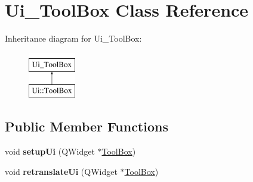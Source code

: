 \hypertarget{class_ui___tool_box}{\section{Ui\-\_\-\-Tool\-Box Class Reference}
\label{class_ui___tool_box}
}
Inheritance diagram for Ui\-\_\-\-Tool\-Box\-:\begin{figure}[H]
\begin{center}
\leavevmode
\includegraphics[height=2.000000cm]{class_ui___tool_box}
\end{center}
\end{figure}
\subsection*{Public Member Functions}
\begin{DoxyCompactItemize}
\item 
\hypertarget{class_ui___tool_box_a1f0b88933866f3957e1ba63a3db292e7}{void {\bfseries setup\-Ui} (Q\-Widget $\ast$\hyperlink{class_tool_box}{Tool\-Box})}\label{class_ui___tool_box_a1f0b88933866f3957e1ba63a3db292e7}

\item 
\hypertarget{class_ui___tool_box_aa1749a1c9f562d4e97b94bd11334cab0}{void {\bfseries retranslate\-Ui} (Q\-Widget $\ast$\hyperlink{class_tool_box}{Tool\-Box})}\label{class_ui___tool_box_aa1749a1c9f562d4e97b94bd11334cab0}

\end{DoxyCompactItemize}
